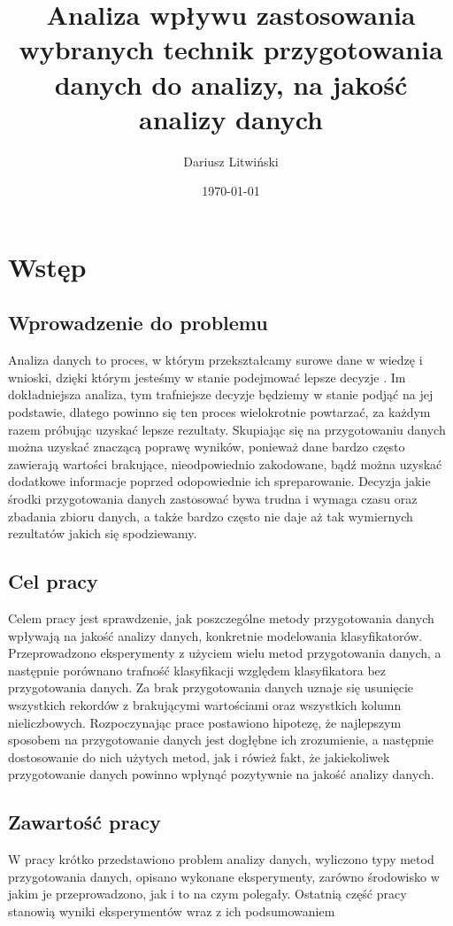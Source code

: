 \documentclass{book}
\title{Analiza wpływu zastosowania wybranych technik przygotowania danych do analizy, na jakość analizy danych}
\author{Dariusz Litwiński}
\date{\today}
\begin{document}


\tableofcontents



\chapter*{Wstęp}

\section*{Wprowadzenie do problemu}
Analiza danych to proces, 
w którym przekształcamy surowe dane w wiedzę i 
wnioski, dzięki którym jesteśmy w stanie podejmować lepsze decyzje \cite{data_analysis_def}.
Im dokładniejsza analiza, tym trafniejsze decyzje będziemy w 
stanie podjąć na jej podstawie, dlatego powinno się ten proces wielokrotnie powtarzać, 
za każdym razem próbując uzyskać lepsze rezultaty. Skupiając się na przygotowaniu danych można uzyskać 
znaczącą poprawę wyników, ponieważ dane bardzo często zawierają wartości brakujące, nieodpowiednio zakodowane, bądź
można uzyskać dodatkowe informacje poprzed odopowiednie ich spreparowanie.
Decyzja jakie środki przygotowania danych zastosować bywa trudna i wymaga czasu oraz zbadania zbioru danych, a także
bardzo często nie daje aż tak wymiernych rezultatów jakich się spodziewamy.

\section*{Cel pracy}
Celem pracy jest sprawdzenie, jak poszczególne metody przygotowania danych
wpływają na jakość analizy danych, konkretnie modelowania klasyfikatorów. Przeprowadzono 
eksperymenty z użyciem wielu metod przygotowania danych, a następnie porównano trafność klasyfikacji 
względem klasyfikatora bez przygotowania danych. Za brak przygotowania danych uznaje się usunięcie 
wszystkich rekordów z brakującymi wartościami oraz wszystkich kolumn nieliczbowych.
Rozpoczynając prace postawiono hipotezę, że najlepszym sposobem na przygotowanie danych jest dogłębne 
ich zrozumienie, a następnie dostosowanie do nich użytych metod, jak i rówież fakt, że jakiekoliwek przygotowanie 
danych powinno wpłynąć pozytywnie na jakość analizy danych.

\section*{Zawartość pracy}
W pracy krótko przedstawiono problem analizy danych, wyliczono 
typy metod przygotowania danych, opisano wykonane eksperymenty, 
zarówno środowisko w jakim je przeprowadzono, jak i to na czym polegały.
Ostatnią część pracy stanowią wyniki eksperymentów wraz z ich podsumowaniem
\end{document}
